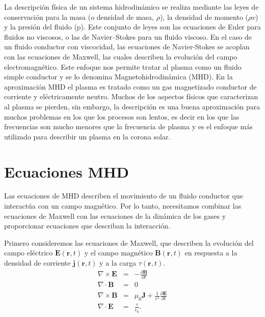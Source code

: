\documentclass[a4paper,11pt]{report}
\begin{document}
La descripción física de un sistema hidrodinámico se realiza mediante las leyes de conservación para la masa (o densidad de masa, $\rho$), la densidad de momento ($\rho v$) y la presión del fluido (p). Este conjunto de leyes son las ecuaciones de Euler para fluidos no viscosos, o las de Navier–Stokes para un fluido viscoso. En el caso de un fluido conductor con viscocidad, las ecuaciones de Navier-Stokes se acoplan con las ecuaciones de Maxwell, las cuales describen la evolución del campo electromagnético. Este enfoque nos permite tratar al plasma como un fluido simple conductor y se lo denomina Magnetohidrodinámica (MHD). En la aproximación MHD el plasma es tratado como un gas magnetizado conductor de corriente y eléctricamente neutro. Muchos de los aspectos físicos que caracterizan al plasma se pierden, sin embargo, la descripción es una buena aproximación para muchos problemas en los que los procesos son lentos, es decir en los que las frecuencias son mucho menores que la frecuencia de plasma y es el enfoque más utilizado para describir un plasma en la corona solar. %



\section{Ecuaciones MHD}\label{mhd_ideal}

Las ecuaciones de MHD describen el movimiento de un fluido conductor que interactúa con un campo magnético. Por lo tanto, necesitamos combinar las ecuaciones de Maxwell con las ecuaciones de la dinámica de los gases y proporcionar ecuaciones que describan la interacción.

Primero consideremos las ecuaciones de Maxwell, que describen la evolución del campo eléctrico $\boldsymbol{E}(\boldsymbol{r},t)$ y el campo magnético $\boldsymbol{B}(\boldsymbol{r},t)$ en respuesta a la densidad de corriente $\boldsymbol{j}(\boldsymbol{r},t)$ y a la carga $\tau(\boldsymbol{r},t)$.
\begin{eqnarray}
\nabla \times \boldsymbol{E} &=& -\frac{\partial\boldsymbol{B}}{\partial t} \label{faraday}\\ 
\nabla \cdot \boldsymbol{B} &=& 0 \\
\nabla \times \boldsymbol{B} &=& \mu_0 \boldsymbol{J} + \frac{1}{c^2}\frac{\partial\boldsymbol{E}}{\partial t}\label{ampere}\\
\nabla \cdot \boldsymbol{E} &=& \frac{\tau}{\epsilon_0}. \label{poisson}\\
\end{eqnarray}
\end{document}
